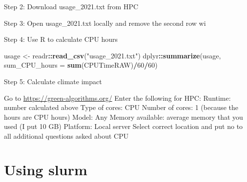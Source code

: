 \documentclass[
]{book}
\newenvironment{Shaded}{\begin{snugshade}}{\end{snugshade}}
\newcommand{\AttributeTok}[1]{\textcolor[rgb]{0.13,0.29,0.53}{#1}}
\newcommand{\DecValTok}[1]{\textcolor[rgb]{0.00,0.00,0.81}{#1}}
\newcommand{\FunctionTok}[1]{\textcolor[rgb]{0.13,0.29,0.53}{\textbf{#1}}}
\newcommand{\NormalTok}[1]{#1}
\newcommand{\OtherTok}[1]{\textcolor[rgb]{0.56,0.35,0.01}{#1}}
\newcommand{\SpecialCharTok}[1]{\textcolor[rgb]{0.81,0.36,0.00}{\textbf{#1}}}
\newcommand{\StringTok}[1]{\textcolor[rgb]{0.31,0.60,0.02}{#1}}
\begin{document}
Step 2: Download usage\_2021.txt from HPC

Step 3: Open usage\_2021.txt locally and remove the second row wi

Step 4: Use R to calculate CPU hours

\begin{Shaded}
\begin{Highlighting}[]
\NormalTok{usage }\OtherTok{\textless{}{-}}\NormalTok{ readr}\SpecialCharTok{::}\FunctionTok{read\_csv}\NormalTok{(}\StringTok{"usage\_2021.txt"}\NormalTok{)}
\NormalTok{dplyr}\SpecialCharTok{::}\FunctionTok{summarize}\NormalTok{(usage, }\AttributeTok{sum\_CPU\_hours =} \FunctionTok{sum}\NormalTok{(CPUTimeRAW)}\SpecialCharTok{/}\DecValTok{60}\SpecialCharTok{/}\DecValTok{60}\NormalTok{)}
\end{Highlighting}
\end{Shaded}

Step 5: Calculate climate impact

Go to
\url{https://green-algorithms.org/} Enter the following for HPC: Runtime:
number calculated above Type of cores: CPU Number of cores: 1 (because
the hours are CPU hours) Model: Any Memory available: average memory
that you used (I put 10 GB) Platform: Local server Select correct
location and put no to all additional questions asked about CPU

\section{Using slurm}\label{using-slurm}
\end{document}
